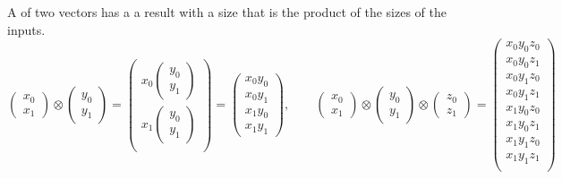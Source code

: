 A  of two vectors has a a result with a
size that is the product of the sizes of the inputs.
\[
\begin{pmatrix}
  x_0\\x_1
\end{pmatrix}
\otimes
\begin{pmatrix}
  y_0\\y_1
\end{pmatrix}
=
\begin{pmatrix}
  x_0
  \begin{pmatrix} y_0\\y_1 \end{pmatrix} \\
  x_1
  \begin{pmatrix} y_0\\y_1 \end{pmatrix} \\
\end{pmatrix}
=
\begin{pmatrix}
  x_0 y_0\\ x_0y_1\\ x_1y_0\\ x_1y_1
\end{pmatrix}
,\qquad
\begin{pmatrix}
  x_0\\x_1
\end{pmatrix}
\otimes
\begin{pmatrix}
  y_0\\y_1
\end{pmatrix}
\otimes
\begin{pmatrix}
  z_0\\z_1
\end{pmatrix}
=
\begin{pmatrix}
  x_0 y_0 z_0\\ x_0 y_0 z_1 \\
  x_0 y_1 z_0\\ x_0 y_1 z_1\\
  x_1 y_0 z_0\\ x_1 y_0 z_1 \\
  x_1 y_1 z_0\\ x_1 y_1 z_1\\
\end{pmatrix}
\]

